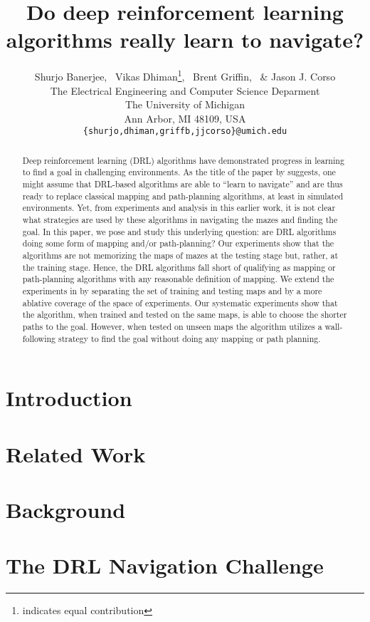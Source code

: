 \documentclass{article} %
\title{Do deep reinforcement learning algorithms really learn to navigate?}
\author{Shurjo Banerjee\footnotemark[1],%
  \, Vikas Dhiman\thanks{indicates equal contribution},%
  \, Brent Griffin,%
  \, \& Jason J. Corso\\
  The Electrical Engineering and Computer Science Deparment\\
The University of Michigan\\
Ann Arbor, MI 48109, USA \\
\texttt{\{shurjo,dhiman,griffb,jjcorso\}@umich.edu} \\
}
\begin{document}
\maketitle
\begin{abstract}
  Deep reinforcement learning (DRL) algorithms have demonstrated progress in learning to find a goal in challenging environments.
  As the title of the paper by \cite{MiPaViICLR2017} suggests, one might assume that DRL-based algorithms are able to ``learn to navigate'' and are thus ready to replace classical mapping and path-planning algorithms, at least in simulated environments.
  Yet, from experiments and analysis in this earlier work, it is not clear what strategies are used by these algorithms in navigating the mazes and finding the goal.
  In this paper, we pose and study this underlying question: are DRL algorithms doing some form of mapping and/or path-planning?  Our experiments show that the algorithms are not memorizing the maps of mazes at the testing stage but, rather, at the training stage.
  Hence, the DRL algorithms fall short of qualifying as mapping or path-planning algorithms with any reasonable definition of mapping.
  We extend the experiments in \cite{MiPaViICLR2017} by separating the set of training and testing maps and by a more ablative coverage of the space of experiments.
  Our systematic experiments show that the \NavAiiiCDiDiiL{} algorithm, when trained and tested on the same maps, is able to choose the shorter paths to the goal. 
  However, when tested on unseen maps the algorithm utilizes a wall-following strategy to find the goal without doing any mapping or path planning.
\end{abstract}

\section{Introduction}


\section{Related Work}


\section{Background}


\section{The DRL Navigation Challenge}

\end{document}
